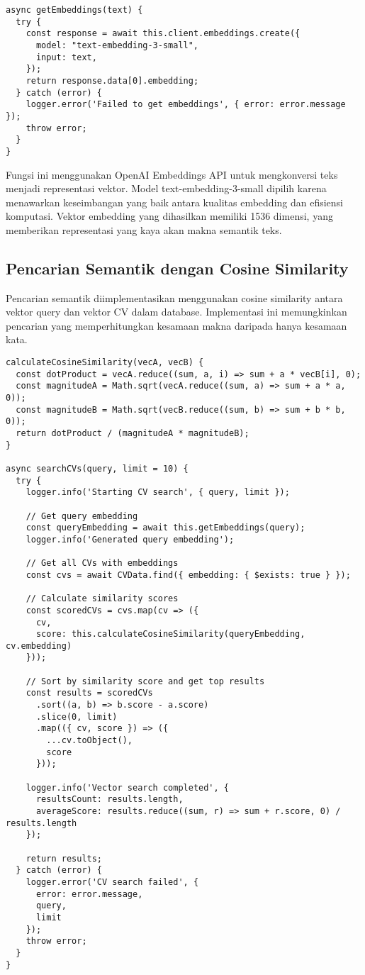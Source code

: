 \begin{verbatim}
async getEmbeddings(text) {
  try {
    const response = await this.client.embeddings.create({
      model: "text-embedding-3-small",
      input: text,
    });
    return response.data[0].embedding;
  } catch (error) {
    logger.error('Failed to get embeddings', { error: error.message });
    throw error;
  }
}
\end{verbatim}

Fungsi ini menggunakan OpenAI Embeddings API untuk mengkonversi teks menjadi representasi vektor. Model text-embedding-3-small dipilih karena menawarkan keseimbangan yang baik antara kualitas embedding dan efisiensi komputasi. Vektor embedding yang dihasilkan memiliki 1536 dimensi, yang memberikan representasi yang kaya akan makna semantik teks.

\subsection{Pencarian Semantik dengan Cosine Similarity}
Pencarian semantik diimplementasikan menggunakan cosine similarity antara vektor query dan vektor CV dalam database. Implementasi ini memungkinkan pencarian yang memperhitungkan kesamaan makna daripada hanya kesamaan kata.

\begin{verbatim}
calculateCosineSimilarity(vecA, vecB) {
  const dotProduct = vecA.reduce((sum, a, i) => sum + a * vecB[i], 0);
  const magnitudeA = Math.sqrt(vecA.reduce((sum, a) => sum + a * a, 0));
  const magnitudeB = Math.sqrt(vecB.reduce((sum, b) => sum + b * b, 0));
  return dotProduct / (magnitudeA * magnitudeB);
}

async searchCVs(query, limit = 10) {
  try {
    logger.info('Starting CV search', { query, limit });

    // Get query embedding
    const queryEmbedding = await this.getEmbeddings(query);
    logger.info('Generated query embedding');

    // Get all CVs with embeddings
    const cvs = await CVData.find({ embedding: { $exists: true } });

    // Calculate similarity scores
    const scoredCVs = cvs.map(cv => ({
      cv,
      score: this.calculateCosineSimilarity(queryEmbedding, cv.embedding)
    }));

    // Sort by similarity score and get top results
    const results = scoredCVs
      .sort((a, b) => b.score - a.score)
      .slice(0, limit)
      .map(({ cv, score }) => ({
        ...cv.toObject(),
        score
      }));

    logger.info('Vector search completed', { 
      resultsCount: results.length,
      averageScore: results.reduce((sum, r) => sum + r.score, 0) / results.length
    });

    return results;
  } catch (error) {
    logger.error('CV search failed', {
      error: error.message,
      query,
      limit
    });
    throw error;
  }
}
\end{verbatim}


